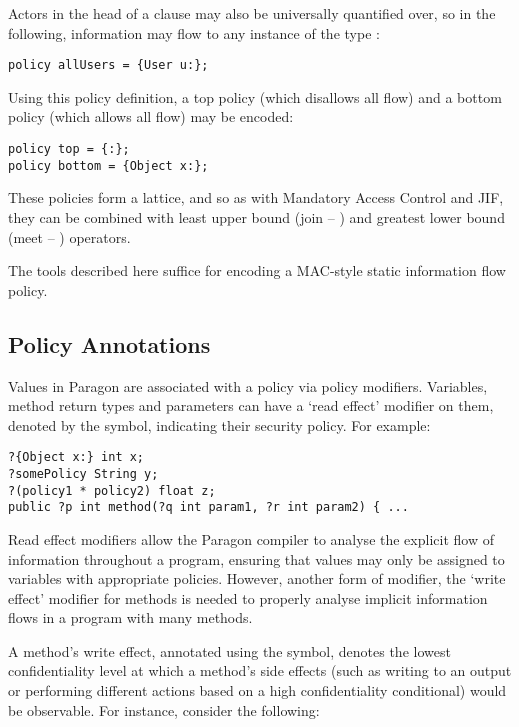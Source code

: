 Actors in the head of a clause may also be universally quantified over, so in the following, information may flow to any instance of the type :

\begin{verbatim}
policy allUsers = {User u:};
\end{verbatim}

Using this policy definition, a top policy (which disallows all flow) and a bottom policy (which allows all flow) may be encoded:

\begin{verbatim}
policy top = {:};
policy bottom = {Object x:};
\end{verbatim}

These policies form a lattice, and so as with Mandatory Access Control and JIF, they can be combined with least upper bound (join -- \mono{*}) and greatest lower bound (meet -- \mono{+}) operators.

The tools described here suffice for encoding a MAC-style static information flow policy.

\subsection{Policy Annotations}

Values in Paragon are associated with a policy via policy modifiers. Variables, method return types and parameters can have a `read effect' modifier on them, denoted by the  symbol, indicating their security policy. For example:

\begin{verbatim}
?{Object x:} int x;
?somePolicy String y;
?(policy1 * policy2) float z;
public ?p int method(?q int param1, ?r int param2) { ...
\end{verbatim}

Read effect modifiers allow the Paragon compiler to analyse the explicit flow of information throughout a program, ensuring that values may only be assigned to variables with appropriate policies. However, another form of modifier, the `write effect' modifier for methods is needed to properly analyse implicit information flows in a program with many methods.

A method's write effect, annotated using the \mono{!} symbol, denotes the lowest confidentiality level at which a method's side effects (such as writing to an output or performing different actions based on a high confidentiality conditional) would be observable. For instance, consider the following:

